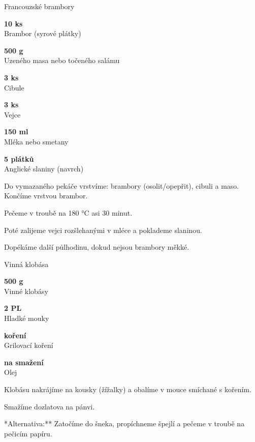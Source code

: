 \documentclass[11pt,a4paper]{article}
\begin{document}
\begin{recipe}[NavyBlue]{Francouzské brambory}
    \begin{ingredients}
        \item \parbox[t]{\linewidth}{\raggedright \piece \textbf{10 ks}\\ Brambor (syrové plátky)}
        \item \parbox[t]{\linewidth}{\raggedright \weight \textbf{500 g}\\ Uzeného masa nebo točeného salámu}
        \item \parbox[t]{\linewidth}{\raggedright \piece \textbf{3 ks}\\ Cibule}
        \item \parbox[t]{\linewidth}{\raggedright \piece \textbf{3 ks}\\ Vejce}
        \item \parbox[t]{\linewidth}{\raggedright \liquid \textbf{150 ml}\\ Mléka nebo smetany}
        \item \parbox[t]{\linewidth}{\raggedright \piece \textbf{5 plátků}\\ Anglické slaniny (navrch)}
    \end{ingredients}
    \begin{steps}
        \item Do vymazaného pekáče vrstvíme: brambory (osolit/opepřit), cibuli a maso. Končíme vrstvou brambor.
        \item Pečeme v troubě na 180 °C asi 30 minut.
        \item Poté zalijeme vejci rozšlehanými v mléce a poklademe slaninou.
        \item Dopékáme další půlhodinu, dokud nejsou brambory měkké.
    \end{steps}
\end{recipe}

\begin{recipe}[Crimson]{Vinná klobása}
    \begin{ingredients}
        \item \parbox[t]{\linewidth}{\raggedright \weight \textbf{500 g}\\ Vinné klobásy}
        \item \parbox[t]{\linewidth}{\raggedright \spoon \textbf{2 PL}\\ Hladké mouky}
        \item \parbox[t]{\linewidth}{\raggedright \indefinite \textbf{koření}\\ Grilovací koření}
        \item \parbox[t]{\linewidth}{\raggedright \liquid \textbf{na smažení}\\ Olej}
    \end{ingredients}
    \begin{steps}
        \item Klobásu nakrájíme na kousky (žížalky) a obalíme v mouce smíchané s kořením.
        \item Smažíme dozlatova na pánvi.
        \item **Alternativa:** Zatočíme do šneka, propíchneme špejlí a pečeme v troubě na pečicím papíru.
    \end{steps}
\end{recipe}
\end{document}

